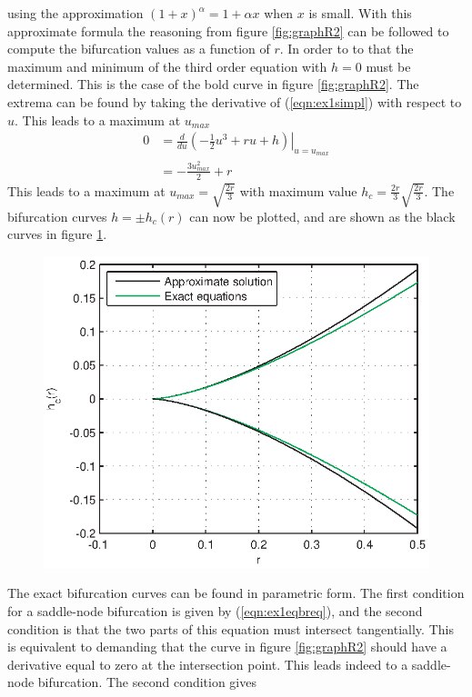 using the approximation $(1+x)^\alpha=1+\alpha x$ when $x$ is small. With this approximate formula the reasoning from figure \ref{fig:graphR2} can be followed to compute the bifurcation values as a function of $r$. In order to to that the maximum and minimum of the third order equation with $h=0$ must be determined. This is the case of the bold curve in figure \ref{fig:graphR2}. The extrema can be found by taking the derivative of (\ref{eqn:ex1simpl}) with respect to $u$. This leads to a maximum at $u_{max}$
\begin{align}
0&=\left.\frac{d}{du}(-\frac{1}{2}u^3+ru+h)\right|_{u=u_{max}}\\
&=-\frac{3u_{max}^2}{2}+r
\end{align} 
This leads to a maximum at $u_{max}=\sqrt{\frac{2r}{3}}$ with maximum value $h_c=\frac{2r}{3}\sqrt{\frac{2r}{3}}$. The bifurcation curves $h=\pm h_c(r)$ can now be plotted, and are shown as the black curves in figure \ref{fig:ex1bifurccurves}.
\begin{figure}[htp]
\centering
\includegraphics{img/ex1/simplebif.eps}
\caption{}
\label{fig:ex1bifurccurves}
\end{figure}
The exact bifurcation curves can be found in parametric form. The first condition for a saddle-node bifurcation is given by (\ref{eqn:ex1eqbreq}), and the second condition is that the two parts of this equation must intersect tangentially. This is equivalent to demanding that the curve in figure \ref{fig:graphR2} should have a derivative equal to zero at the intersection point. This leads indeed to a saddle-node bifurcation. The second condition gives
